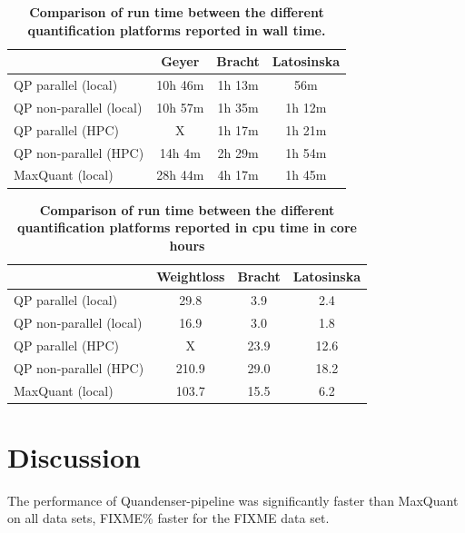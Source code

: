 \documentclass[11pt]{article}
\begin{document}
\begin{table}[!h]
  \begin{center}
  \caption{\textbf{Comparison of run time between the different quantification platforms reported in wall time.}}
  \label{table:walltime}
\begin{tabular}{lccc}
& Geyer & Bracht & Latosinska \\ \hline \hline
QP parallel (local) & 10h 46m & 1h 13m & 56m \\
QP non-parallel (local) & 10h 57m & 1h 35m & 1h 12m \\
QP parallel (HPC) & X & 1h 17m & 1h 21m \\  %
QP non-parallel (HPC) & 14h 4m & 2h 29m & 1h 54m \\  %
MaxQuant (local) & 28h 44m & 4h 17m & 1h 45m \\
\end{tabular}
\end{center}
\end{table}

\begin{table}[!h]
  \begin{center}
  \caption{\textbf{Comparison of run time between the different quantification platforms reported in cpu time in core hours}}
  \label{table:cputime}
\begin{tabular}{lccc}
& Weightloss & Bracht & Latosinska \\ \hline \hline
QP parallel (local) & 29.8 & 3.9 & 2.4 \\
QP non-parallel (local) & 16.9 & 3.0 & 1.8 \\
QP parallel (HPC) & X & 23.9 & 12.6 \\
QP non-parallel (HPC) & 210.9 & 29.0 & 18.2 \\
MaxQuant (local) & 103.7 & 15.5 & 6.2 \\
\end{tabular}
\end{center}
\end{table}

\section*{Discussion}
The performance of Quandenser-pipeline was significantly faster than MaxQuant on all data sets, FIXME\% faster for the FIXME data set.
\end{document}
